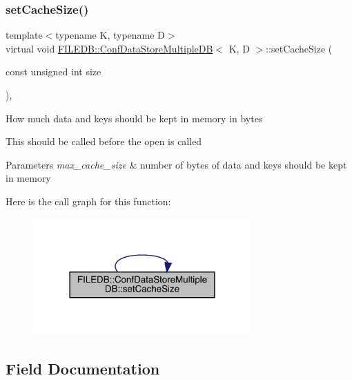 \subsubsection{\texorpdfstring{setCacheSize()}{setCacheSize()}\hspace{0.1cm}{\footnotesize\ttfamily [2/2]}}
{\footnotesize\ttfamily template$<$typename K, typename D$>$ \\
virtual void \mbox{\hyperlink{classFILEDB_1_1ConfDataStoreMultipleDB}{F\+I\+L\+E\+D\+B\+::\+Conf\+Data\+Store\+Multiple\+DB}}$<$ K, D $>$\+::set\+Cache\+Size (\begin{DoxyParamCaption}\item[{const unsigned int}]{size }\end{DoxyParamCaption})\hspace{0.3cm}{\ttfamily [inline]}, {\ttfamily [virtual]}}

How much data and keys should be kept in memory in bytes

This should be called before the open is called 
\begin{DoxyParams}{Parameters}
{\em max\+\_\+cache\+\_\+size} & number of bytes of data and keys should be kept in memory \\
\hline
\end{DoxyParams}
Here is the call graph for this function\+:\nopagebreak
\begin{figure}[H]
\begin{center}
\leavevmode
\includegraphics[width=237pt]{d3/dc0/classFILEDB_1_1ConfDataStoreMultipleDB_a37115269cf1f8f04c49ab888b040fa13_cgraph}
\end{center}
\end{figure}


\subsection{Field Documentation}
\mbox{\label{classFILEDB_1_1ConfDataStoreMultipleDB_a9f562b5117bbeced1cbcae8498d6a884}} 
